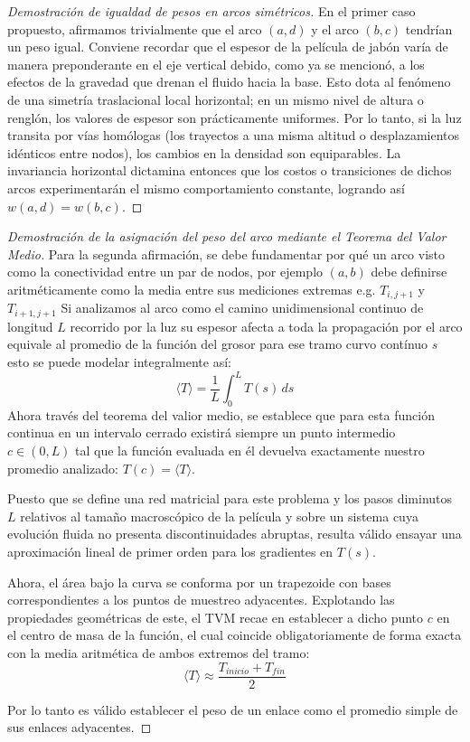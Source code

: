 \begin{proof}[Demostración de igualdad de pesos en arcos simétricos]
    En el primer caso propuesto, afirmamos trivialmente que el arco $(a,d)$ y el arco $(b,c)$ tendrían un peso igual. Conviene recordar que el espesor de la película de jabón varía de manera preponderante en el eje vertical debido, como ya se mencionó, a los efectos de la gravedad que drenan el fluido hacia la base. Esto dota al fenómeno de una simetría traslacional local horizontal; en un mismo nivel de altura o renglón, los valores de espesor son prácticamente uniformes. Por lo tanto, si la luz transita por vías homólogas (los trayectos a una misma altitud o desplazamientos idénticos entre nodos), los cambios en la densidad son equiparables. La invariancia horizontal dictamina entonces que los costos o transiciones de dichos arcos experimentarán el mismo comportamiento constante, logrando así $w(a,d) = w(b,c)$.
\end{proof}

\begin{proof}[Demostración de la asignación del peso del arco mediante el Teorema del Valor Medio]
    Para la segunda afirmación, se debe fundamentar por qué un arco visto como la conectividad entre un par de nodos, por ejemplo $(a,b)$ debe definirse aritméticamente como la media entre sus mediciones extremas e.g. $T_{i,j+1}$ y $T_{i+1,j+1}$ Si analizamos al arco como el camino unidimensional continuo de longitud $L$ recorrido por la luz su espesor afecta a toda la propagación por el arco equivale al promedio de la función del grosor para ese tramo curvo contínuo $s$ esto se puede modelar integralmente así:
    \[ \langle T \rangle = \frac{1}{L} \int_{0}^{L} T(s) \, ds \]
    Ahora través del teorema del valior medio, se establece que para esta función continua en un intervalo cerrado existirá siempre un punto intermedio $c \in (0, L)$ tal que la función evaluada en él devuelva exactamente nuestro promedio analizado: $T(c) = \langle T \rangle$.
    
    Puesto que se define una red matricial para este problema y los pasos diminutos $L$ relativos al tamaño macroscópico de la película y sobre un sistema cuya evolución fluida no presenta discontinuidades abruptas, resulta válido ensayar una aproximación lineal de primer orden para los gradientes en $T(s)$. 
    
    Ahora, el área bajo la curva se conforma por un trapezoide con bases correspondientes a los puntos de muestreo adyacentes. Explotando las propiedades geométricas de este, el TVM recae en establecer a dicho punto $c$ en el centro de masa de la función, el cual coincide obligatoriamente de forma exacta con la media aritmética de ambos extremos del tramo:
    \[ \langle T \rangle \approx \frac{T_{inicio} + T_{fin}}{2} \]
    
    Por lo tanto es válido establecer el peso de un enlace como el promedio simple de sus enlaces adyacentes.
\end{proof}

